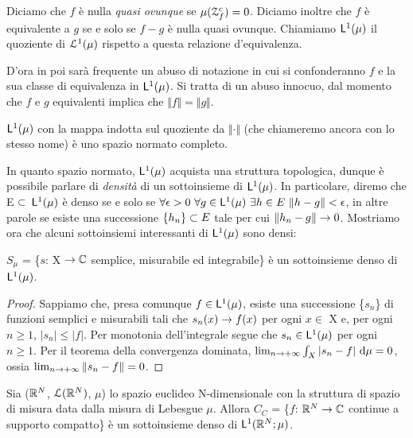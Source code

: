 \documentclass[Completo.tex]{subfiles}
\begin{document}
\begin{Def}
	Diciamo che $f$ è nulla \textit{quasi ovunque} se $\mu(\eu[Z]_f^{c}) = 0$. Diciamo inoltre che $f$ è equivalente a $g$ se e solo se $f-g$ è nulla quasi ovunque. Chiamiamo $\sf[L]^1(\mu)$ il quoziente di $\eu[L]^1(\mu)$ rispetto a questa relazione d'equivalenza.
\end{Def}
\begin{Oss}
	D'ora in poi sarà frequente un abuso di notazione in cui si confonderanno $f$ e la sua classe di equivalenza in $\sf[L]^1(\mu)$. Si tratta di un abuso innocuo, dal momento che $f$ e $g$ equivalenti implica che $\Vert f \Vert = \Vert g \Vert$.
\end{Oss}
\begin{eTh}
	$\sf[L]^1(\mu)$ con la mappa indotta sul quoziente da $\Vert \cdot \Vert$ (che chiameremo ancora con lo stesso nome) è uno spazio normato completo.
\end{eTh}
In quanto spazio normato, $\sf[L]^1(\mu)$ acquista una struttura topologica, dunque è possibile parlare di \textit{densità} di un sottoinsieme di $\sf[L]^1(\mu)$. In particolare, diremo che E $\subset$ $\sf[L]^1(\mu)$ è denso se e solo se $\forall \epsilon > 0 \ \forall g \in \sf[L]^1(\mu) \ \exists h \in E \ \Vert h - g \Vert < \epsilon$, in altre parole se esiste una successione $\{h_n\} \subset E$ tale per cui $\Vert h_n-g \Vert \rightarrow 0$. Mostriamo ora che alcuni sottoinsiemi interessanti di $\sf[L]^1(\mu)$ sono densi:
\begin{eTh}
	$S_\mu$ = \{$s$: X $\ra \bb[C]$ semplice, misurabile ed integrabile\} è un sottoinsieme denso di $\sf[L]^1(\mu)$.
\end{eTh}
\begin{proof}
	Sappiamo che, presa comunque $f \in \sf[L]^1(\mu)$, esiste una successione \{$s_n$\} di funzioni semplici e misurabili tali che $s_n(x) \rightarrow f(x)$ per ogni $x \in$ X e, per ogni $n \geq 1$, $\vert s_n \vert \leq \vert f \vert$. Per monotonia dell'integrale segue che $s_n \in \sf[L]^1(\mu)$ per ogni $n \geq 1$. Per il teorema della convergenza dominata, $\lim_{n \ra +\infty} \int_X \vert s_n - f \vert \ \mathrm{d}\mu = 0$, ossia $\lim_{n \rightarrow +\infty} \Vert s_n - f \Vert = 0$.
\end{proof}
\begin{Th}
	Sia ($\bb[R]^{N}$, $\eu[L](\bb[R]^{N})$, $\mu$) lo spazio euclideo N-dimensionale con la struttura di spazio di misura data dalla misura di Lebesgue $\mu$. Allora $C_C$ = \{$f$: $\bb[R]^{N} \ra \bb[C]$ continue a supporto compatto\} è un sottoinsieme denso di $\sf[L]^1(\bb[R]^{N}; \mu)$.
\end{Th}
\end{document}
